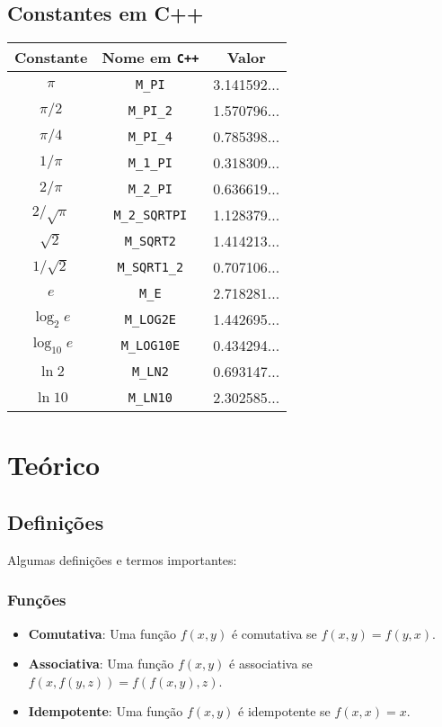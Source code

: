 \documentclass[10pt, a4paper, oneside]{book}
\begin{document}
\section{Constantes em C++}

\begin{center}
\begin{tabular}{|c|c|c|}
  \hline
  Constante & Nome em \texttt{C++} & Valor \\
  \hline
  $\pi$ & \texttt{M\_PI} & 3.141592... \\
  \hline
  $\pi / 2$ & \texttt{M\_PI\_2} & 1.570796... \\
  \hline
  $\pi / 4$ & \texttt{M\_PI\_4} & 0.785398... \\
  \hline
  $1 / \pi$ & \texttt{M\_1\_PI} & 0.318309... \\
  \hline
  $2 / \pi$ & \texttt{M\_2\_PI} & 0.636619... \\
  \hline
  $2 / \sqrt{\pi}$ & \texttt{M\_2\_SQRTPI} & 1.128379... \\
  \hline
  $\sqrt{2}$ & \texttt{M\_SQRT2} & 1.414213... \\
  \hline
  $1 / \sqrt{2}$ & \texttt{M\_SQRT1\_2} & 0.707106... \\
  \hline
  $e$ & \texttt{M\_E} & 2.718281... \\
  \hline
  $\log_2{e}$ & \texttt{M\_LOG2E} & 1.442695... \\
  \hline
  $\log_{10}{e}$ & \texttt{M\_LOG10E} & 0.434294... \\
  \hline
  $\ln{2}$ & \texttt{M\_LN2} & 0.693147... \\
  \hline
  $\ln{10}$ & \texttt{M\_LN10} & 2.302585... \\
  \hline
\end{tabular}
\end{center}
\chapter{Teórico}


\section {Definições}

Algumas definições e termos importantes:


\subsection{Funções}

\begin{itemize}
  \item \textbf{Comutativa}: Uma função $f(x, y)$ é comutativa se $f(x, y) = f(y, x)$.
  \item \textbf{Associativa}: Uma função $f(x, y)$ é associativa se $f(x, f(y, z)) = f(f(x, y), z)$.
  \item \textbf{Idempotente}: Uma função $f(x, y)$ é idempotente se $f(x, x) = x$.
\end{itemize}
\end{document}
